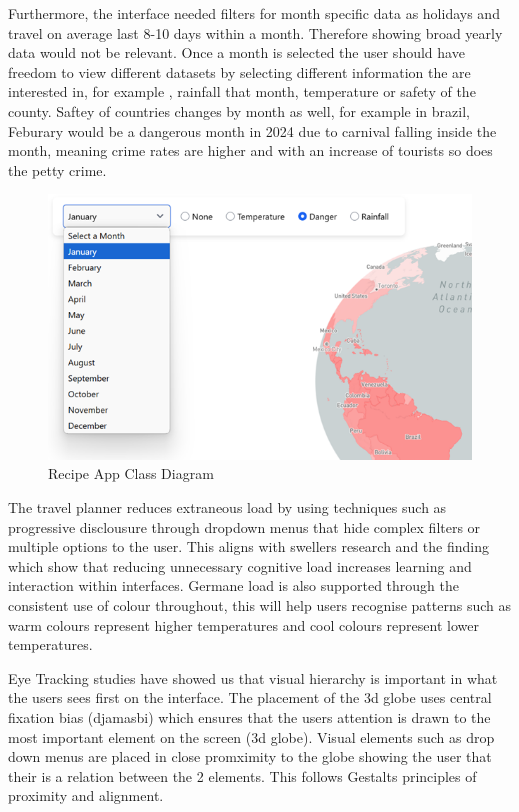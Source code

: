 \documentclass[]{project_interim}
\begin{document}
Furthermore, the interface needed filters for month specific data as holidays and travel on average last 8-10 days within a month. Therefore showing broad yearly data would not be relevant. Once a month is selected the user should have freedom to view different datasets by selecting different information the are interested in, for example , rainfall that month, temperature or safety of the county.
Saftey of countries changes by month as well, for example in brazil, Feburary would be a dangerous month in 2024 due to carnival falling inside the month, meaning crime rates are higher and with an increase of tourists so does the petty crime.

\begin{figure}[ht!]
  \centering
  \includegraphics[width=\textwidth]{TP-nav.png}
  \vspace*{0.0cm}
  \caption{Recipe App Class Diagram}
  \label{fig:1}
\end{figure}

The travel planner reduces extraneous load by using techniques such as progressive disclousure through dropdown menus that hide complex filters or multiple options to the user. This aligns with swellers research and the finding which show that reducing unnecessary cognitive load increases learning and interaction within interfaces.
Germane load is also supported through the consistent use of colour throughout, this will help users recognise patterns such as warm colours represent higher temperatures and cool colours represent lower temperatures.

Eye Tracking studies have showed us that visual hierarchy is important in what the users sees first on the interface. The placement of the 3d globe uses central fixation bias (djamasbi) which ensures that the users attention is drawn to the most important element on the screen (3d globe). Visual elements such as drop down menus are placed in close promximity to the globe showing the user that their is a relation between the 2 elements. This follows Gestalts principles of proximity and alignment\cite{todorovic_gestalt_2008}.
\end{document}
